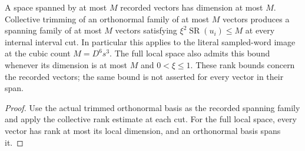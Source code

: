 \begin{lemma}
    \label{lem:interval_recorded_generator_bounds}
    \leanok
    A space spanned by at most $M$ recorded vectors has dimension at most
    $M$. Collective trimming of an orthonormal family of at most $M$
    vectors produces a spanning family of at most $M$ vectors satisfying
    $\xi^2\operatorname{SR}(u_i)\le M$ at every internal interval cut.
    In particular this applies to the literal sampled-word image at the
    cubic count $M=D^6s^3$.
    The full local space also admits this bound whenever its dimension
    is at most $M$ and $0<\xi\le1$.
    These rank bounds concern the recorded vectors; the same bound is
    not asserted for every vector in their span.
\end{lemma}
\begin{proof}\leanok
    Use the actual trimmed orthonormal basis as the recorded spanning
    family and apply the collective rank estimate at each cut.
    For the full local space, every vector has rank at most its local
    dimension, and an orthonormal basis spans it.
\end{proof}

